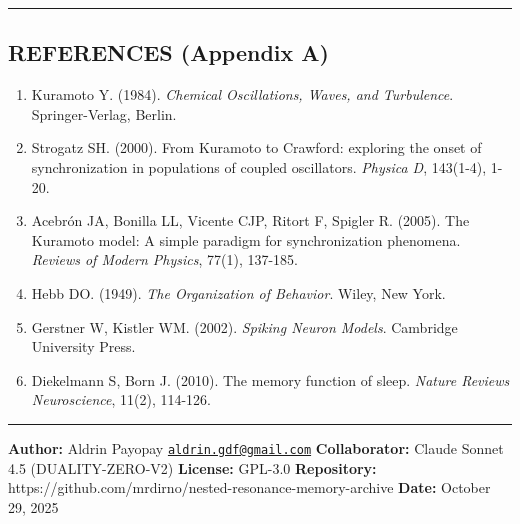 \documentclass[
]{article}
\begin{document}
\begin{center}\rule{0.5\linewidth}{0.5pt}\end{center}

\subsection{REFERENCES (Appendix A)}\label{references-appendix-a}

\begin{enumerate}
\def\labelenumi{\arabic{enumi}.}
\item
  Kuramoto Y. (1984). \emph{Chemical Oscillations, Waves, and
  Turbulence}. Springer-Verlag, Berlin.
\item
  Strogatz SH. (2000). From Kuramoto to Crawford: exploring the onset of
  synchronization in populations of coupled oscillators. \emph{Physica
  D}, 143(1-4), 1-20.
\item
  Acebrón JA, Bonilla LL, Vicente CJP, Ritort F, Spigler R. (2005). The
  Kuramoto model: A simple paradigm for synchronization phenomena.
  \emph{Reviews of Modern Physics}, 77(1), 137-185.
\item
  Hebb DO. (1949). \emph{The Organization of Behavior}. Wiley, New York.
\item
  Gerstner W, Kistler WM. (2002). \emph{Spiking Neuron Models}.
  Cambridge University Press.
\item
  Diekelmann S, Born J. (2010). The memory function of sleep.
  \emph{Nature Reviews Neuroscience}, 11(2), 114-126.
\end{enumerate}

\begin{center}\rule{0.5\linewidth}{0.5pt}\end{center}

\textbf{Author:} Aldrin Payopay
\href{mailto:aldrin.gdf@gmail.com}{\nolinkurl{aldrin.gdf@gmail.com}}
\textbf{Collaborator:} Claude Sonnet 4.5 (DUALITY-ZERO-V2)
\textbf{License:} GPL-3.0 \textbf{Repository:}
https://github.com/mrdirno/nested-resonance-memory-archive
\textbf{Date:} October 29, 2025
\end{document}
